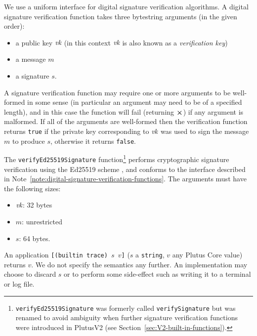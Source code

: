 

\label{note:digital-signature-verification-functions}
We use a uniform interface for digital signature verification algorithms. A
digital signature verification function takes three bytestring arguments (in the
given order):
\begin{itemize}
  \item a public key $\textit{vk}$ (in this context $\textit{vk}$ is also known as a \textit{verification key}) 
  \item a message $m$
  \item a signature  $s$.
\end{itemize}
\noindent A signature verification function may require one
or more arguments to be well-formed in some sense (in particular an argument
may need to be of a specified length), and in this case the function will fail
(returning $\errorX$) if any argument is malformed. If all of the arguments are
well-formed then the verification function returns \texttt{true} if the private
key corresponding to $\textit{vk}$ was used to sign the message $m$ to produce $s$,
otherwise it returns \texttt{false}.

\label{note:ed25519-signature-verification}
The \texttt{verifyEd25519Signature}
function\footnote{\texttt{verifyEd25519Signature} was formerly called
  \texttt{verifySignature} but was renamed to avoid ambiguity when further
  signature verification functions were introduced in PlutusV2 (see
  Section~\ref{sec:V2-built-in-functions}).}  performs cryptographic
signature verification using the Ed25519 scheme \cite{ches-2011-24091,
  rfc8032-EdDSA}, and conforms to the interface described in
Note~\ref{note:digital-signature-verification-functions}.  The arguments must
have the following sizes:
\begin{itemize}
\item $\textit{vk}$: 32 bytes
\item $m$: unrestricted
\item $s$: 64 bytes.
\end{itemize}



\label{note:trace}
An application \texttt{[(builtin trace) $s$ $v$]} ($s$ a \texttt{string}, $v$
any Plutus Core value) returns $v$.  We do not specify the semantics any
further.  An implementation may choose to discard $s$ or to perform some
side-effect such as writing it to a terminal or log file.

\newpage
